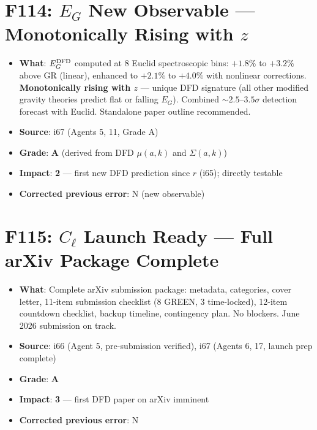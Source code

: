\documentclass[11pt,a4paper]{article}
\newcommand{\grade}[1]{\textbf{#1}}
\newcommand{\impact}[1]{\textbf{#1}}
\begin{document}
\section{F114: $E_G$ New Observable --- Monotonically Rising with $z$}
\begin{itemize}[nosep]
\item \textbf{What}: $E_G^{\rm DFD}$ computed at 8 Euclid spectroscopic bins: $+1.8\%$ to $+3.2\%$ above GR (linear), enhanced to $+2.1\%$ to $+4.0\%$ with nonlinear corrections. \textbf{Monotonically rising with $z$} --- unique DFD signature (all other modified gravity theories predict flat or falling $E_G$). Combined $\sim 2.5$--$3.5\sigma$ detection forecast with Euclid. Standalone paper outline recommended.
\item \textbf{Source}: i67 (Agents 5, 11, Grade A)
\item \textbf{Grade}: \grade{A} (derived from DFD $\mu(a,k)$ and $\Sigma(a,k)$)
\item \textbf{Impact}: \impact{2} --- first new DFD prediction since $r$ (i65); directly testable
\item \textbf{Corrected previous error}: N (new observable)
\end{itemize}

\section{F115: $C_\ell$ Launch Ready --- Full arXiv Package Complete}
\begin{itemize}[nosep]
\item \textbf{What}: Complete arXiv submission package: metadata, categories, cover letter, 11-item submission checklist (8 GREEN, 3 time-locked), 12-item countdown checklist, backup timeline, contingency plan. No blockers. June 2026 submission on track.
\item \textbf{Source}: i66 (Agent 5, pre-submission verified), i67 (Agents 6, 17, launch prep complete)
\item \textbf{Grade}: \grade{A}
\item \textbf{Impact}: \impact{3} --- first DFD paper on arXiv imminent
\item \textbf{Corrected previous error}: N
\end{itemize}
\end{document}
